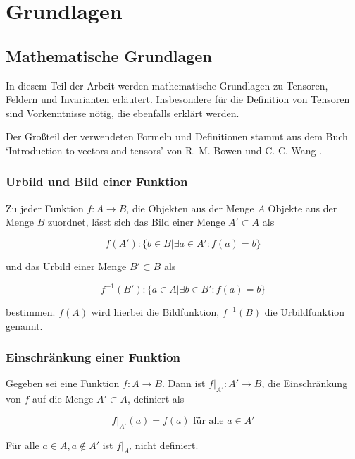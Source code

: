 \documentclass[a4paper,fontsize=12pt,toc=bib,halfparskip,ngerman]{scrartcl}
\begin{document}
\section{Grundlagen}
\label{sec:Grundlagen}
\subsection{Mathematische Grundlagen}
In diesem Teil der Arbeit werden mathematische Grundlagen zu Tensoren, Feldern und Invarianten erl\"autert. Insbesondere f\"ur die Definition von Tensoren sind Vorkenntnisse n\"otig, die ebenfalls erkl\"art werden. 

Der Gro{\ss}teil der verwendeten Formeln und Definitionen stammt aus dem Buch `Introduction to vectors and tensors' von R. M. Bowen und C. C. Wang \cite{bowen2008introduction}.

\subsubsection{Urbild und Bild einer Funktion}
Zu jeder Funktion $f: A \rightarrow B$, die Objekten aus der Menge $A$ Objekte aus der Menge  $B$ zuordnet, l\"asst sich das Bild einer Menge $A' \subset A$ als

\begin{equation}
	f(A'): \{ b \in B | \exists a \in A' : f(a) = b \}
\end{equation}

und das Urbild einer Menge $B' \subset B$ als

\begin{equation}
	f^{-1}(B'): \{ a \in A | \exists b \in B' : f(a) = b\}
\end{equation}

bestimmen. $f(A)$ wird hierbei die Bildfunktion, $f^{-1}(B)$ die Urbildfunktion genannt. 

\subsubsection{Einschr\"ankung einer Funktion}
Gegeben sei eine Funktion $f: A \rightarrow B$. Dann ist $f|_{A'}: A' \rightarrow B$, die Einschr\"ankung von $f$ auf die Menge $A' \subset A$, definiert als 

\begin{equation}
	f|_{A'}(a) = f(a) \text{ f\"ur alle } a \in A'
\end{equation}

F\"ur alle $a \in A, a \notin A'$ ist $f|_{A'}$ nicht definiert. 
\end{document}
